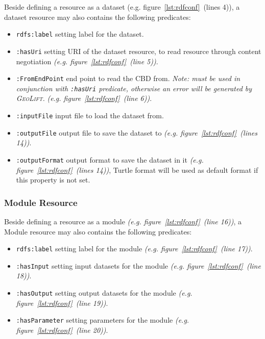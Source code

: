 \documentclass[a4paper,twoside,bibtotoc,abstracton,12pt,BCOR=15mm]{article}
\newcommand{\geolift}{\textsc{GeoLift}\xspace}
\begin{document}
    Beside defining a resource as a dataset (e.g. figure~\ref{lst:rdfconf}~(lines 4)),
    a dataset resource may also contains the following predicates:
    \begin{itemize}
	\item \texttt{rdfs:label} setting label for the dataset.
	\item \texttt{:hasUri} setting URI of the dataset resource, to read resource through content negotiation \emph{(e.g. figure~\ref{lst:rdfconf}~(line 5))}.
	\item \texttt{:FromEndPoint} end point to read the CBD from. 
	\emph{Note: must be used in conjunction with \texttt{:hasUri} predicate, otherwise an error will be generated by \geolift.} \emph{(e.g. figure~\ref{lst:rdfconf}~(line 6))}.
	\item \texttt{:inputFile} input file to load the dataset from.
	\item \texttt{:outputFile} output file to save the dataset to \emph{(e.g. figure~\ref{lst:rdfconf}~(lines 14))}.
	\item \texttt{:outputFormat} output format to save the dataset in it \emph{(e.g. figure~\ref{lst:rdfconf}~(lines 14))}, Turtle format will be used as default format if this property is not set.
    \end{itemize}

\subsubsection{Module Resource}
    Beside defining a resource as a module \emph{(e.g. figure~\ref{lst:rdfconf}~(line 16))},
    a Module resource may also contains the following predicates:
    \begin{itemize}
	\item \texttt{rdfs:label} setting label for the module \emph{(e.g. figure~\ref{lst:rdfconf}~(line 17))}.
	\item \texttt{:hasInput} setting input datasets for the module \emph{(e.g. figure~\ref{lst:rdfconf}~(line 18))}.
	\item \texttt{:hasOutput} setting output datasets for the module \emph{(e.g. figure~\ref{lst:rdfconf}~(line 19))}.
	\item \texttt{:hasParameter} setting parameters for the module \emph{(e.g. figure~\ref{lst:rdfconf}~(line 20))}.
    \end{itemize}
\end{document}
